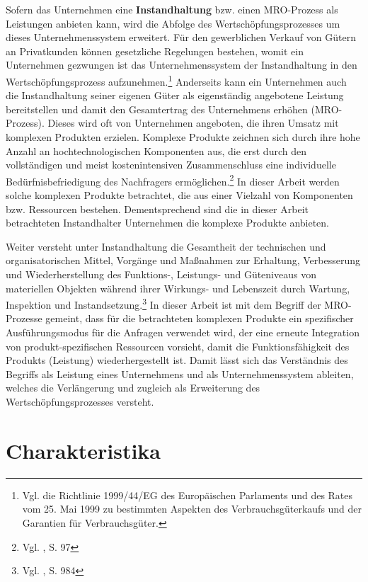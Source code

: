 Sofern das Unternehmen eine \textbf{Instandhaltung} bzw. einen MRO-Prozess als Leistungen anbieten kann, wird die Abfolge des Wertschöpfungsprozesses um dieses Unternehmenssystem erweitert. Für den gewerblichen Verkauf von Gütern an Privatkunden können gesetzliche Regelungen bestehen, womit ein Unternehmen gezwungen ist das Unternehmenssystem der Instandhaltung in den Wertschöpfungsprozess aufzunehmen.\footnote{Vgl. die Richtlinie 1999/44/EG des Europäischen Parlaments und des Rates vom 25. Mai 1999 zu bestimmten Aspekten des Verbrauchsgüterkaufs und der Garantien für Verbrauchsgüter.} Anderseits kann ein Unternehmen auch die Instandhaltung seiner eigenen Güter als eigenständig angebotene Leistung bereitstellen und damit den Gesamtertrag des Unternehmens erhöhen (MRO-Prozess). Dieses wird oft von Unternehmen angeboten, die ihren Umsatz mit komplexen Produkten erzielen. Komplexe Produkte zeichnen sich durch ihre hohe Anzahl an hochtechnologischen Komponenten aus, die erst durch den vollständigen und meist kostenintensiven Zusammenschluss eine individuelle Bedürfnisbefriedigung des Nachfragers ermöglichen.\footnote{Vgl. \cite{komplexe2009Schmidt}, S. 97} In dieser Arbeit werden solche komplexen Produkte betrachtet, die aus einer Vielzahl von Komponenten bzw. Ressourcen bestehen. Dementsprechend sind die in dieser Arbeit betrachteten Instandhalter Unternehmen die komplexe Produkte anbieten. 

Weiter versteht \citeauthor{helbing2010instandhaltung} unter Instandhaltung die \glqq Gesamtheit der technischen und organisatorischen Mittel, Vorgänge und Maßnahmen zur Erhaltung, Verbesserung und Wiederherstellung des Funktions-, Leistungs- und Güteniveaus von materiellen Objekten während ihrer Wirkungs- und Lebenszeit durch Wartung, Inspektion und Instandsetzung.\grqq\footnote{Vgl. \citeauthor{helbing2010instandhaltung}, S. 984} In dieser Arbeit ist mit dem Begriff der MRO-Prozesse gemeint, dass für die betrachteten komplexen Produkte ein spezifischer Ausführungsmodus für die Anfragen verwendet wird, der eine erneute Integration von produkt-spezifischen Ressourcen vorsieht, damit die Funktionsfähigkeit des Produkts (Leistung) wiederhergestellt ist. Damit lässt sich das Verständnis des Begriffs als Leistung eines Unternehmens und als Unternehmenssystem ableiten, welches die Verlängerung und zugleich als Erweiterung des Wertschöpfungsprozesses versteht.

\section{Charakteristika}


